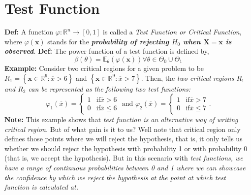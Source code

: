 \documentclass[a4paper]{article}
\begin{document}
\section{Test Function}
\textbf{Def:} A function $\varphi : \mathbb{R}^{n} \to [0,1] $ is called a \textit{Test Function or Critical Function}, where $\varphi\left( \mathbf{x} \right) $ stands for the \textit{\textbf{probability of rejecting $H_0$ when $\mathbf{X} = \mathbf{x}$ is observed}}.
\newline\newline
\textbf{Def:} The power function of a test function is defined by,
$$\beta\left(\theta \right)  = \mathbb{E}_\theta \left( \varphi \left( \mathbf{x} \right)  \right) \forall \theta \in \Theta_0 \cup \Theta_1 $$
\textbf{Example:} Consider two critical regions for a given problem to be $R_1 = \left\{ \mathbf{x} \in\mathbb{R}^{9}:\overline{x}>6 \right\}$ and $\left\{ \mathbf{x} \in \mathbb{R}^{9} : \overline{x} > 7 \right\}$.
\newline\newline
Then, the \textit{two critical regions $R_1$ and $R_2$ can be represented as the following two test functions:
}
\[
	\varphi_1\left( \overline{x} \right)  = \begin{cases}
		1 & \text{if} \overline{x} > 6\\
		0 & \text{if} \overline{x} \le  6
	\end{cases} \text{ and } \varphi_2\left( \overline{x} \right) = \begin{cases}
		1 & \text{if} \overline{x} > 7\\
		0 & \text{if}\overline{x} \le 7
	\end{cases}
.\]
\textbf{Note:} This example shows that \textit{test function is an alternative way of writing critical region.}
But of what gain is it to us? Well note that critical region only defines those points where we will reject the hypothesis, that is, it only tells us whether we should reject the hypothesis with probability 1 or with probability 0 (that is, we accept the hypothesis). But in this scenario with \textit{test functions, we have a range of continuous probabilities between 0 and 1 where we can showcase the confidence by which we reject the hypothesis at the point at  which test function is calculated at.}



\
\end{document}

